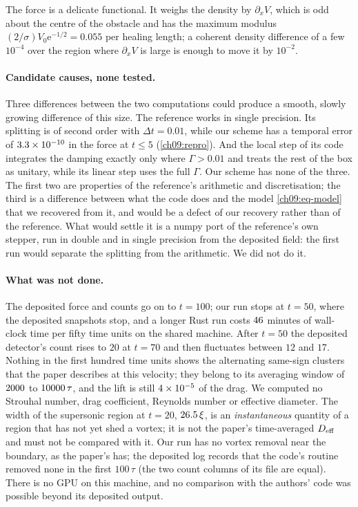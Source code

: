 The force is a delicate functional. It weighs the density by $\partial_xV$, which is odd about the centre of the obstacle and has the maximum modulus $(2/\sigma)V_0\mathrm e^{-1/2}=0.055$ per healing length; a coherent density difference of a few $10^{-4}$ over the region where $\partial_xV$ is large is enough to move it by $10^{-2}$.

\paragraph{Candidate causes, none tested.} Three differences between the two computations could produce a smooth, slowly growing difference of this size. The reference works in single precision. Its splitting is of second order with $\Delta t=0.01$, while our scheme has a temporal error of $3.3\times10^{-10}$ in the force at $t\le5$ (\cref{ch09:repro}). And the local step of its code integrates the damping exactly only where $\Gamma>0.01$ and treats the rest of the box as unitary, while its linear step uses the full $\Gamma$. Our scheme has none of the three. The first two are properties of the reference's arithmetic and discretisation; the third is a difference between what the code does and the model \eqref{ch09:eq-model} that we recovered from it, and would be a defect of our recovery rather than of the reference. What would settle it is a numpy port of the reference's own stepper, run in double and in single precision from the deposited field: the first run would separate the splitting from the arithmetic. We did not do it.

\paragraph{What was not done.} The deposited force and counts go on to $t=100$; our run stops at $t=50$, where the deposited snapshots stop, and a longer Rust run costs $46$ minutes of wall-clock time per fifty time units on the shared machine. After $t=50$ the deposited detector's count rises to $20$ at $t=70$ and then fluctuates between $12$ and $17$. Nothing in the first hundred time units shows the alternating same-sign clusters that the paper describes at this velocity; they belong to its averaging window of $2000$ to $10000\,\tau$, and the lift is still $4\times10^{-5}$ of the drag. We computed no Strouhal number, drag coefficient, Reynolds number or effective diameter. The width of the supersonic region at $t=20$, $26.5\,\xi$, is an \emph{instantaneous} quantity of a region that has not yet shed a vortex; it is not the paper's time-averaged $D_{\rm eff}$ and must not be compared with it. Our run has no vortex removal near the boundary, as the paper's has; the deposited log records that the code's routine removed none in the first $100\,\tau$ (the two count columns of its file are equal). There is no GPU on this machine, and no comparison with the authors' code was possible beyond its deposited output.

